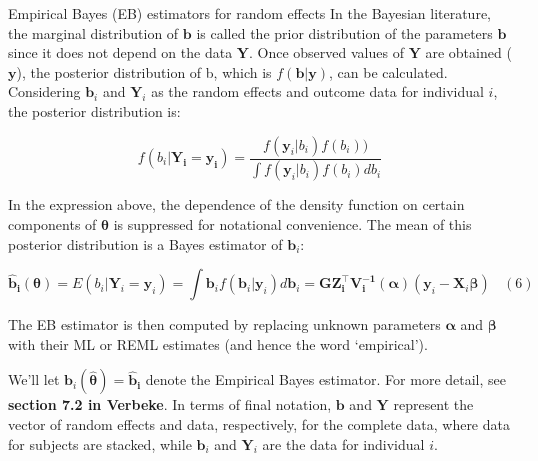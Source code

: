 \documentclass[
  9pt,
  ignorenonframetext,
]{beamer}
\begin{document}
\begin{frame}{Empirical Bayes (EB) estimators for random effects}
\protect\hypertarget{empirical-bayes-eb-estimators-for-random-effects}{}
In the Bayesian literature, the marginal distribution of \(\pmb b\) is
called the prior distribution of the parameters \(\pmb b\) since it does
not depend on the data \(\pmb Y\). Once observed values of \(\pmb Y\)
are obtained (\(\pmb y\)), the posterior distribution of b, which is
\(f(\pmb b|\pmb y)\), can be calculated. Considering \(\pmb b_i\) and
\(\pmb Y_i\) as the random effects and outcome data for individual
\(i\), the posterior distribution is:

\[
f(b_i|\pmb {Y_i = y_i}) = \frac {f(\pmb y_i |b_i)f(b_i))} {\int f(\pmb y_i|b_i) f(b_i) db_i}
\]

In the expression above, the dependence of the density function on
certain components of \(\pmb \theta\) is suppressed for notational
convenience. The mean of this posterior distribution is a Bayes
estimator of \(\pmb b_i\):

\[
\pmb {\hat b_i} (\pmb \theta) = E(b_i |\pmb Y_i = \pmb y_i)
=\int \pmb b_i f(\pmb b_i | \pmb y_i)d \pmb b_i 
= \pmb {G Z_i^{\top} V_i^{-1} (\alpha)} (\pmb {y}_i - \pmb {X}_i \pmb \beta) \ \ \ \ (6)
\]
\end{frame}

\begin{frame}{}
\protect\hypertarget{section-2}{}
The EB estimator is then computed by replacing unknown parameters
\(\pmb \alpha\) and \(\pmb \beta\) with their ML or REML estimates (and
hence the word `empirical').

We'll let \(\pmb b_i (\pmb {\hat \theta})= \pmb {\hat b_i}\) denote the
Empirical Bayes estimator. For more detail, see \textbf{section 7.2 in
Verbeke}. In terms of final notation, \(\pmb b\) and \(\pmb Y\)
represent the vector of random effects and data, respectively, for the
complete data, where data for subjects are stacked, while \(\pmb b_i\)
and \(\pmb Y_i\) are the data for individual \(i\).
\end{frame}
\end{document}
